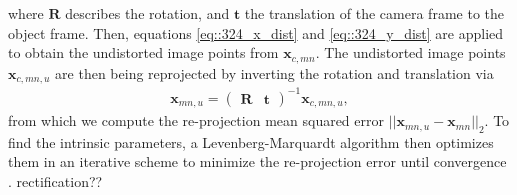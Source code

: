 where $\bm{R}$ describes the rotation, and $\bm{t}$ the translation of the camera frame to the object frame. Then, equations \ref{eq::324_x_dist} and \ref{eq::324_y_dist} are applied to obtain the undistorted image points from $\bm{x}_{c,mn}$. The undistorted image points $\bm{x}_{c,mn,u}$ are then being reprojected by inverting the rotation and translation via
\begin{align}
	\bm{x}_{mn,u} = \begin{pmatrix}
	\bm{R} & \bm{t}
	\end{pmatrix}^{-1}\bm{x}_{c,mn,u},
\end{align}
from which we compute the re-projection mean squared error $||\bm{x}_{mn,u} - \bm{x}_{mn}||_2$. To find the intrinsic parameters, a Levenberg-Marquardt algorithm then optimizes them in an iterative scheme to minimize the re-projection error until convergence \cite{zhang2000flexible}.
\cite{loop1999computing} rectification??\\
